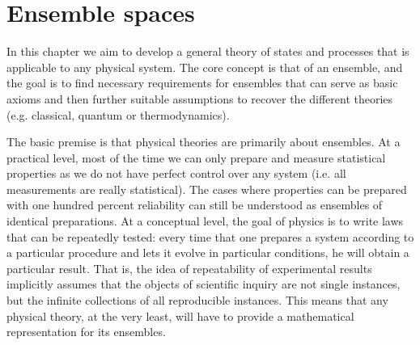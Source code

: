 
\def\>{\rangle}
\def\<{\langle}

\newcommand\mix{\mathrm{mix}}
\newcommand\component{\mathrm{comp}}
\newcommand\cospan{\mathrm{cospan}}
\newcommand\dist{\mathrm{dist}}
\newcommand\hull{\mathrm{hull}}
\newcommand\shull{\mathrm{shull}}
\newcommand\chull{\mathrm{chull}}
\newcommand\support{\mathrm{supp}}
\newcommand\scap{\mathrm{scap}}
\newcommand\fraction{\mathrm{frac}}
\newcommand\fcap{\mathrm{fcap}}

\newcommand\vspan{\mathrm{span}}
\newcommand\cl{\mathrm{cl}}

\def\separate{\downmodels}
\def\nseparate{\ndownmodels}
\def\ortho{\perp}
\def\northo{\nperp}

%

\newcommand{\ens}[1][e] {\mathsf{#1}} %
\newcommand{\Ens}[1][E] {\mathcal{#1}} %

\newcommand{\titledbreak}[1]{
	\newpage
	\vspace{3em}  %
	\noindent
	\centerline{\huge\centering\textbf{#1}} %
	\par\nobreak
	\noindent\rule{\textwidth}{0.5pt}  %
}
\chapter{Ensemble spaces}

In this chapter we aim to develop a general theory of states and processes that is applicable to any physical system. The core concept is that of an ensemble, and the goal is to find necessary requirements for ensembles that can serve as basic axioms and then further suitable assumptions to recover the different theories (e.g. classical, quantum or thermodynamics).

The basic premise is that physical theories are primarily about ensembles. At a practical level, most of the time we can only prepare and measure statistical properties as we do not have perfect control over any system (i.e. all measurements are really statistical). The cases where properties can be prepared with one hundred percent reliability can still be understood as ensembles of identical preparations. At a conceptual level, the goal of physics is to write laws that can be repeatedly tested: every time that one prepares a system according to a particular procedure and lets it evolve in particular conditions, he will obtain a particular result. That is, the idea of repeatability of experimental results implicitly assumes that the objects of scientific inquiry are not single instances, but the infinite collections of all reproducible instances. This means that any physical theory, at the very least, will have to provide a mathematical representation for its ensembles.


